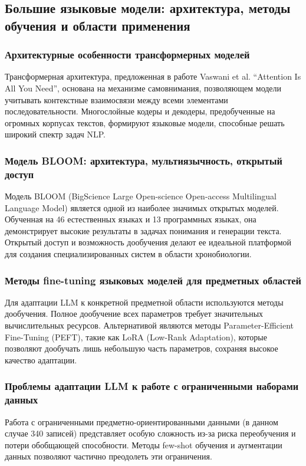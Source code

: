 \documentclass[a4paper,14pt]{extarticle}
\begin{document}
	\subsection{Большие языковые модели: архитектура, методы обучения и области применения}
	
	\subsubsection{Архитектурные особенности трансформерных моделей}
	Трансформерная архитектура, предложенная в работе Vaswani et al. ``Attention Is All You Need'', основана на механизме самовнимания, позволяющем модели учитывать контекстные взаимосвязи между всеми элементами последовательности. Многослойные кодеры и декодеры, предобученные на огромных корпусах текстов, формируют языковые модели, способные решать широкий спектр задач NLP.
	
	\subsubsection{Модель BLOOM: архитектура, мультиязычность, открытый доступ}
	Модель BLOOM (BigScience Large Open-science Open-access Multilingual Language Model) является одной из наиболее значимых открытых моделей. Обученная на 46 естественных языках и 13 программных языках, она демонстрирует высокие результаты в задачах понимания и генерации текста. Открытый доступ и возможность дообучения делают ее идеальной платформой для создания специализированных систем в области хронобиологии.
	
	\subsubsection{Методы fine-tuning языковых моделей для предметных областей}
	Для адаптации LLM к конкретной предметной области используются методы дообучения. Полное дообучение всех параметров требует значительных вычислительных ресурсов. Альтернативой являются методы Parameter-Efficient Fine-Tuning (PEFT), такие как LoRA (Low-Rank Adaptation), которые позволяют дообучать лишь небольшую часть параметров, сохраняя высокое качество адаптации.
	
	\subsubsection{Проблемы адаптации LLM к работе с ограниченными наборами данных}
	Работа с ограниченными предметно-ориентированными данными (в данном случае 340 записей) представляет особую сложность из-за риска переобучения и потери обобщающей способности. Методы few-shot обучения и аугментации данных позволяют частично преодолеть эти ограничения.
	
\end{document}
